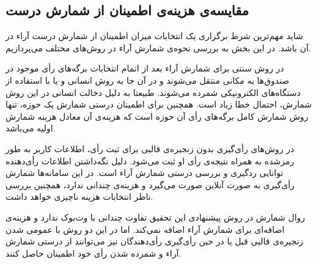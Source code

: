 \subsection{مقایسه‌ی هزینه‌ی اطمینان از شمارش درست}
شاید مهم‌ترین شرط برگزاری یک انتخابات میزان اطمینان از شمارش درست آراء در آن‌ باشد. در این بخش به بررسی نحوه‌ی شمارش آراء در روش‌های مختلف می‌پردازیم. 
\par
در روش سنتی برای شمارش آراء بعد از اتمام انتخابات برگه‌های رأی‌ موجود در صندوق‌ها به مکانی منتقل می‌شوند و در آن‌ جا به روش انسانی و یا با استفاده از دستگاه‌های الکترونیکی شمرده می‌شوند. طبیعتا به دلیل دخالت انسانی در این روش شمارش، احتمال خطا زیاد است. همچنین برای اطمینان درستی شمارش یک حوزه، تنها روش شمارش کامل برگه‌های رأی‌ آن حوزه است که هزینه‌ی آن معادل هزینه شمارش اولیه می‌باشد. 
\par 
در روش‌های رأی‌گیری بدون زنجیره‌ی قالبی برای ثبت رأی، اطلاعات کاربر به طور رمزشده به همراه نتیجه‌ی رأی‌ او ثبت می‌شود. دلیل نگه‌داشتن اطلاعات رأی‌دهنده توانایی رد‌گیری و بررسی درستی شمارش آراء است. در این سامانه‌ها شمارش رأی‌گیری به صورت آنلاین صورت می‌گیرد و هزینه‌ی چندانی ندارد، همچنین بررسی ناظر انتخابات هزینه‌ ناچیزی خواهد داشت. 
\par 
روال شمارش در روش پیشنهادی این تحقیق تفاوت چندانی با وت‌بوک ندارد و هزینه‌ی اضافه‌ای برای شمارش آراء اضافه نمی‌کند. اما در این دو روش با عمومی شدن زنجیره‌ی قالبی قبل یا در حین رأی‌گیری رأی‌دهندگان نیز می‌توانند از درستی شمارش آراء و شمرده شدن رأی خود اطمینان حاصل کنند. 
